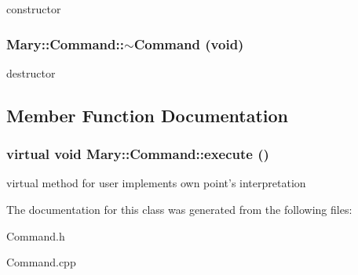constructor \hypertarget{class_mary_1_1_command_071172304126f8e6e7f74bff0c3dbbe4}{
\subsubsection[$\sim$Command]{\setlength{\rightskip}{0pt plus 5cm}Mary::Command::$\sim$Command (void)}}
\label{class_mary_1_1_command_071172304126f8e6e7f74bff0c3dbbe4}


destructor 

\subsection{Member Function Documentation}
\hypertarget{class_mary_1_1_command_728ec9aacd0254361f7962b0b032ec55}{
\subsubsection[execute]{\setlength{\rightskip}{0pt plus 5cm}virtual void Mary::Command::execute ()}}
\label{class_mary_1_1_command_728ec9aacd0254361f7962b0b032ec55}


virtual method for user implements own point's interpretation 

The documentation for this class was generated from the following files:\begin{CompactItemize}
\item 
Command.h\item 
Command.cpp\end{CompactItemize}
